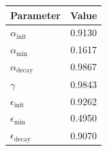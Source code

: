 \begin{tabular}{lc}
\hline
\textbf{Parameter} & \textbf{Value} \\
\hline
$\alpha_{\text{init}}$ & 0.9130 \\
$\alpha_{\min}$ & 0.1617 \\
$\alpha_{\text{decay}}$ & 0.9867 \\
$\gamma$ & 0.9843 \\
$\epsilon_{\text{init}}$ & 0.9262 \\
$\epsilon_{\min}$ & 0.4950 \\
$\epsilon_{\text{decay}}$ & 0.9070 \\
\hline
\end{tabular}